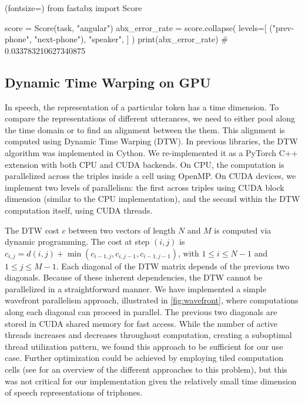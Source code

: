 \documentclass[11pt]{article}
\begin{document}
\begin{python}[Score](fontsize=\noexpand\footnotesize)
from fastabx import Score

score = Score(task, "angular")
abx_error_rate = score.collapse(
  levels=[
    ("prev-phone", "next-phone"),
    "speaker",
  ]
)
print(abx_error_rate)
# 0.033783210627340875
\end{python}

\subsection{Dynamic Time Warping on GPU}
In speech, the representation of a particular token has a time dimension. To compare the representations of different utterances, we need to either pool along the time domain or to find an alignment between the them. This alignment is computed using Dynamic Time Warping (DTW).
In previous libraries, the DTW algorithm was implemented in Cython. We re-implemented it as a PyTorch C++ extension with both CPU and CUDA backends.
On CPU, the computation is parallelized across the triples inside a cell using OpenMP. On CUDA devices, we implement two levels of parallelism: the first across triples using CUDA block dimension (similar to the CPU implementation), and the second within the DTW computation itself, using CUDA threads.

The DTW cost $c$ between two vectors of length $N$ and $M$ is computed via dynamic programming. The cost at step $(i, j)$ is $c_{i,j} = d(i, j) + \min \left( c_{i - 1, j}, c_{i, j - 1}, c_{i - 1, j - 1} \right)$, with  $1 \leq i \leq N -1$ and $1 \leq j \leq M -1$. Each diagonal of the DTW matrix depends of the previous two diagonals. Because of these inherent dependencies, the DTW cannot be parallelized in a straightforward manner. We have implemented a simple wavefront parallelism approach, illustrated in \cref{fig:wavefront}, where computations along each diagonal can proceed in parallel. The previous two diagonals are stored in CUDA shared memory for fast access. While the number of active threads increases and decreases throughout computation, creating a suboptimal thread utilization pattern, we found this approach to be sufficient for our use case. Further optimization could be achieved by employing tiled computation cells (see \citet{10.1145/2751205.2751243} for an overview of the different approaches to this problem), but this was not critical for our implementation given the relatively small time dimension of speech representations of triphones.
\end{document}

